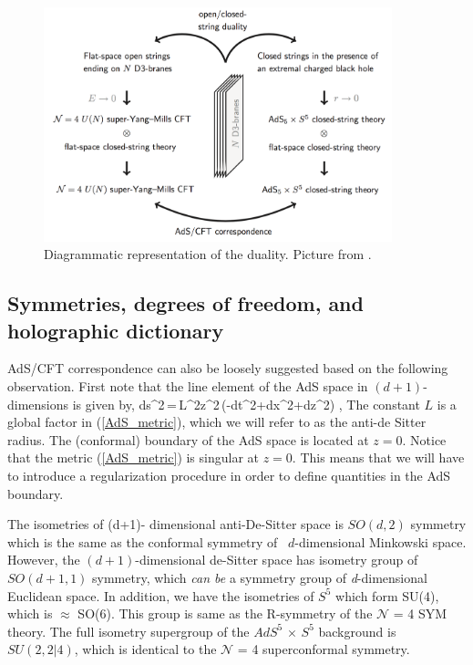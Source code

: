 \begin{figure}[h!]
\label{fig:AdS1} 
  \centering
      \includegraphics[width=0.9\textwidth]{./Figures/ads22.jpg}
  \caption{\label{fig:AdS1}Diagrammatic representation of the duality. Picture from \cite{ZEA}.}
\end{figure}



\subsection{Symmetries, degrees of freedom, and holographic dictionary} 

AdS/CFT correspondence can also be loosely suggested based on the following observation. First note that 
the line element of the AdS space  in $(d+1)$-dimensions is given by,
\beq
ds^2\,=\,{L^2\over z^2}\,(-dt^2+d\vec x^2+dz^2)\,\,,
\label{AdS_metric}
\eeq
The constant $L$ is a global factor in (\ref{AdS_metric}), which we will refer to as the anti-de Sitter radius. 
The (conformal) boundary of the AdS space is located at $z=0$. Notice that the metric (\ref{AdS_metric}) is singular at $z=0$.
This means that  we will have to introduce a regularization procedure in order to define quantities in the AdS boundary.


The isometries of (d+1)- dimensional anti-De-Sitter space is $SO(d,2)$ symmetry which is the same as the conformal symmetry of \
$d$-dimensional Minkowski space. However, the $(d+1)$-dimensional de-Sitter space has isometry group of $SO(d+1,1)$ symmetry, 
which \textit{can be} a symmetry group of \textit{d}-dimensional Euclidean space.  In addition, we have the isometries of $S^{5}$ 
which form SU(4), which is $\approx$ SO(6). This group is same as the R-symmetry of the $\mathcal{N}$ = 4 SYM theory. The full isometry supergroup
of the $AdS^{5}$ $\times$ $S^{5}$ background is $SU(2, 2|4)$, which is identical to the $\mathcal{N}$ = 4 superconformal symmetry.

